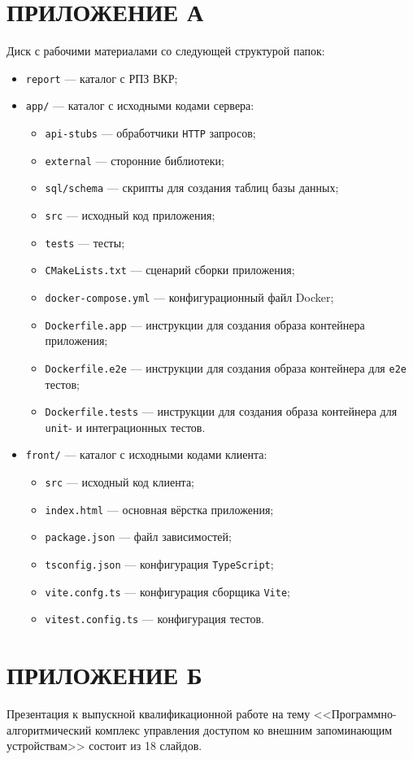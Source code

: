 \chapter*{ПРИЛОЖЕНИЕ А}

Диск с рабочими материалами со следующей структурой папок:

\begin{itemize}[label=---]
    \item \texttt{report} --- каталог с РПЗ ВКР;
    \item \texttt{app/} --- каталог с исходными кодами сервера:
    \begin{itemize}[label=---]
        \item \texttt{api-stubs} --- обработчики \texttt{HTTP} запросов;
        \item \texttt{external} --- сторонние библиотеки;
        \item \texttt{sql/schema} --- скрипты для создания таблиц базы данных;
        \item \texttt{src} --- исходный код приложения;
        \item \texttt{tests} --- тесты;
        \item \texttt{CMakeLists.txt} --- сценарий сборки приложения;
        \item \texttt{docker-compose.yml} --- конфигурационный файл Docker;
        \item \texttt{Dockerfile.app} --- инструкции для создания образа контейнера приложения;
        \item \texttt{Dockerfile.e2e} --- инструкции для создания образа контейнера для \texttt{e2e} тестов;
        \item \texttt{Dockerfile.tests} --- инструкции для создания образа контейнера для \texttt{unit}- и интеграционных тестов.
    \end{itemize}
    \item \texttt{front/} --- каталог с исходными кодами клиента:
    \begin{itemize}[label=---]
        \item \texttt{src} --- исходный код клиента;
        \item \texttt{index.html} --- основная вёрстка приложения;
        \item \texttt{package.json} --- файл зависимостей;
        \item \texttt{tsconfig.json} --- конфигурация \texttt{TypeScript};
        \item \texttt{vite.confg.ts} --- конфигурация сборщика \texttt{Vite};
        \item \texttt{vitest.config.ts} --- конфигурация тестов.
    \end{itemize}
\end{itemize}

\chapter*{ПРИЛОЖЕНИЕ Б}

Презентация к выпускной квалификационной работе на тему 
<<Программно-алгоритмический комплекс управления доступом ко внешним запоминающим устройствам>>
состоит из 18 слайдов.
